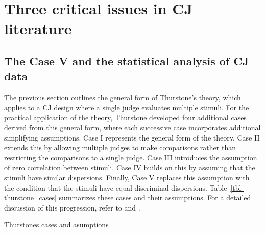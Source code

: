 \documentclass[
  authoryear,
  preprint,
  1p]{elsarticle}
\begin{document}
\section{Three critical issues in CJ
literature}\label{sec-theory-issues}

\subsection{The Case V and the statistical analysis of CJ
data}\label{sec-theory-issue1}

The previous section outlines the general form of Thurstone's theory,
which applies to a CJ design where a single judge evaluates multiple
stimuli. For the practical application of the theory, Thurstone
developed four additional cases derived from this general form, where
each successive case incorporates additional simplifying assumptions.
Case I represents the general form of the theory. Case II extends this
by allowing multiple judges to make comparisons rather than restricting
the comparisons to a single judge. Case III introduces the assumption of
zero correlation between stimuli. Case IV builds on this by assuming
that the stimuli have similar dispersions. Finally, Case V replaces this
assumption with the condition that the stimuli have equal discriminal
dispersions. Table~\ref{tbl-thurstone_cases} summarizes these cases and
their assumptions. For a detailed discussion of this progression, refer
to \citet{Thurstone_1927b} and \citet[pp.~248-253]{Bramley_2008}.

\begin{table}

\caption{\label{tbl-thurstone_cases}Thurstones cases and asumptions}


\end{table}%
\end{document}
